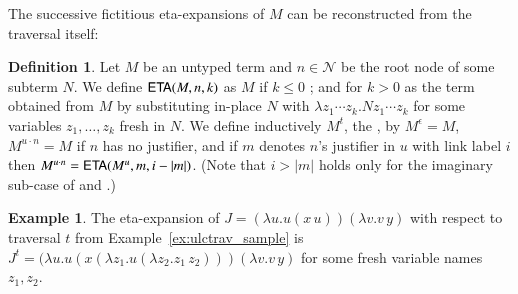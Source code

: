 \documentclass{elsarticle}
\newif\iflongversion
\theoremstyle{plain}
\theoremstyle{definition}
\newtheorem{definition}{Definition}[section]
\newtheorem{example}{Example}[section]
\newcommand\Nodes{\mathcal{N}}%
\newcommand{\ctree}{\Tau} %
\begin{document}
The successive fictitious eta-expansions of $M$ can be reconstructed from the traversal itself:
\begin{definition}
\label{def:onthefly_etaexpansion}
Let $M$ be an untyped term and $n\in \Nodes$ be the root node of some subterm $N$. We define ${\sf ETA}(M, n, k)$ as $M$
if $k \leq 0$ ; and for $k> 0$ as the term obtained from $M$ by substituting in-place $N$ with $\lambda z_1 \cdots z_k. N z_1 \cdots z_k$ for some variables $z_1, \ldots, z_k$ fresh in $N$.
%
We define inductively $M^t$,  the , by $M^\epsilon = M$,
$M^{u \cdot n} = M$ if $n$ has no justifier, and if $m$ denotes $n$'s justifier in $u$ with link label $i$ then $M^{u \cdot n} = {\sf ETA}(M^{u}, m, i-|m|)$.
%
(Note that $i>|m|$ holds only for the imaginary sub-case of  and .)
\end{definition}

\iflongversion
It follows that $M$ is a sub-tree of $M^t$: paths in $\ctree(M)$ are also paths in $\ctree(M^t)$.
\fi

\begin{example}
The eta-expansion of $J = (\lambda u . u(x\,u)) (\lambda v . v\,y)$ with respect to traversal $t$ from Example~\ref{ex:ulctrav_sample} is
$J^t = (\lambda u . u(x (\lambda z_1. u (\lambda z_2.z_1\,z_2))) (\lambda v . v\,y)$
for some fresh variable names $z_1, z_2$.
\end{example}
\end{document}
